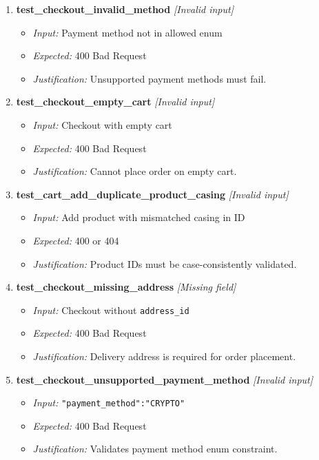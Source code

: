 \documentclass{article}
\begin{document}
\begin{enumerate}[resume, label=\textbf{TC\arabic*.}]
\item \textbf{test\_checkout\_invalid\_method} \textit{[Invalid input]}
\begin{itemize}[noitemsep]
  \item \textit{Input:} Payment method not in allowed enum
  \item \textit{Expected:} 400 Bad Request
  \item \textit{Justification:} Unsupported payment methods must fail.
\end{itemize}

\item \textbf{test\_checkout\_empty\_cart} \textit{[Invalid input]}
\begin{itemize}[noitemsep]
  \item \textit{Input:} Checkout with empty cart
  \item \textit{Expected:} 400 Bad Request
  \item \textit{Justification:} Cannot place order on empty cart.
\end{itemize}

\item \textbf{test\_cart\_add\_duplicate\_product\_casing} \textit{[Invalid input]}
\begin{itemize}[noitemsep]
  \item \textit{Input:} Add product with mismatched casing in ID
  \item \textit{Expected:} 400 or 404
  \item \textit{Justification:} Product IDs must be case-consistently validated.
\end{itemize}

\item \textbf{test\_checkout\_missing\_address} \textit{[Missing field]}
\begin{itemize}[noitemsep]
  \item \textit{Input:} Checkout without \texttt{address\_id}
  \item \textit{Expected:} 400 Bad Request
  \item \textit{Justification:} Delivery address is required for order placement.
\end{itemize}

\item \textbf{test\_checkout\_unsupported\_payment\_method} \textit{[Invalid input]}
\begin{itemize}[noitemsep]
  \item \textit{Input:} \texttt{"payment\_method":"CRYPTO"}
  \item \textit{Expected:} 400 Bad Request
  \item \textit{Justification:} Validates payment method enum constraint.
\end{itemize}
\end{enumerate}
\end{document}
